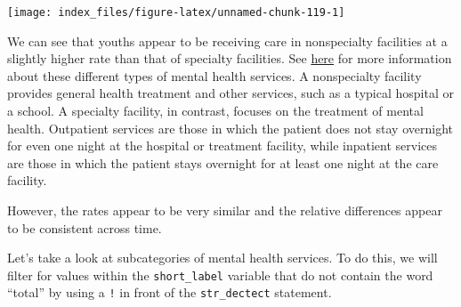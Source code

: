 \documentclass[
]{article}
\begin{document}
\begin{center}\texttt{[image: index\_files/figure-latex/unnamed-chunk-119-1]} \end{center}

We can see that youths appear to be receiving care in nonspecialty
facilities at a slightly higher rate than that of specialty facilities.
See
\href{https://www.northtexashelp.com/mental-health-treatment-settings.html}{here}
for more information about these different types of mental health
services. A nonspecialty facility provides general health treatment and
other services, such as a typical hospital or a school. A specialty
facility, in contrast, focuses on the treatment of mental health.
Outpatient services are those in which the patient does not stay
overnight for even one night at the hospital or treatment facility,
while inpatient services are those in which the patient stays overnight
for at least one night at the care facility.

However, the rates appear to be very similar and the relative
differences appear to be consistent across time.

Let's take a look at subcategories of mental health services. To do
this, we will filter for values within the \texttt{short\_label}
variable that do not contain the word ``total'' by using a \texttt{!} in
front of the \texttt{str\_dectect} statement.
\end{document}
